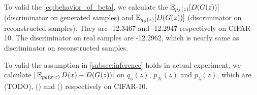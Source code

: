 To valid the \cref{eq:behavior_of_beta}, we calculate the $\operatorname{\mathbb{E}}_{p_\lambda(z)}[ D(G(z))]$ (discriminator on generated samples) and $\operatorname{\mathbb{E}}_{q_\phi(z)}[ D(G(z))]$ (discriminator on reconstructed samples). They are -12.3467 and -12.2947 respectively on CIFAR-10. The discriminator on real samples are -12.2962, which is nearly same as discriminator on reconstructed samples. 

To valid the assumption in \cref{subsec:inference} holds in actual experiment, we calculate $|\operatorname{\mathbb{E}}_{p_\theta(x|z)}D(x) - D(G(z))|$ on $q_\phi(z)$, $p_\mathcal{N}(z)$ and $p_\lambda(z)$, which are (TODO), () and () respectively on CIFAR-10. 






